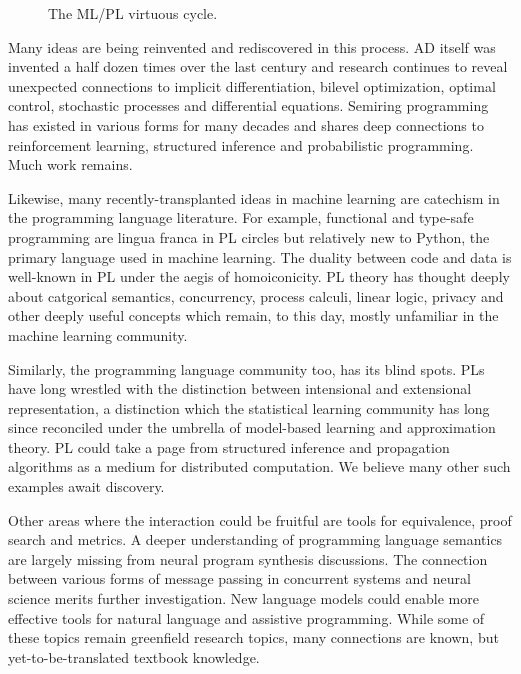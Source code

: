 \documentclass{article}
\begin{document}
    \begin{figure}[H]
        \centering
        \caption{The ML/PL virtuous cycle.}
    \end{figure}

    Many ideas are being reinvented and rediscovered in this process. AD itself was invented a half dozen times over the last century and research continues to reveal unexpected connections to implicit differentiation, bilevel optimization, optimal control, stochastic processes and differential equations. Semiring programming has existed in various forms for many decades and shares deep connections to reinforcement learning, structured inference and probabilistic programming. Much work remains.

    Likewise, many recently-transplanted ideas in machine learning are catechism in the programming language literature. For example, functional and type-safe programming are lingua franca in PL circles but relatively new to Python, the primary language used in machine learning. The duality between code and data is well-known in PL under the aegis of homoiconicity. PL theory has thought deeply about catgorical semantics, concurrency, process calculi, linear logic, privacy and other deeply useful concepts which remain, to this day, mostly unfamiliar in the machine learning community.

    Similarly, the programming language community too, has its blind spots. PLs have long wrestled with the distinction between intensional and extensional representation, a distinction which the statistical learning community has long since reconciled under the umbrella of model-based learning and approximation theory. PL could take a page from structured inference and propagation algorithms as a medium for distributed computation. We believe many other such examples await discovery.

    Other areas where the interaction could be fruitful are tools for equivalence, proof search and metrics. A deeper understanding of programming language semantics are largely missing from neural program synthesis discussions. The connection between various forms of message passing in concurrent systems and neural science merits further investigation. New language models could enable more effective tools for natural language and assistive programming. While some of these topics remain greenfield research topics, many connections are known, but yet-to-be-translated textbook knowledge.
\end{document}
